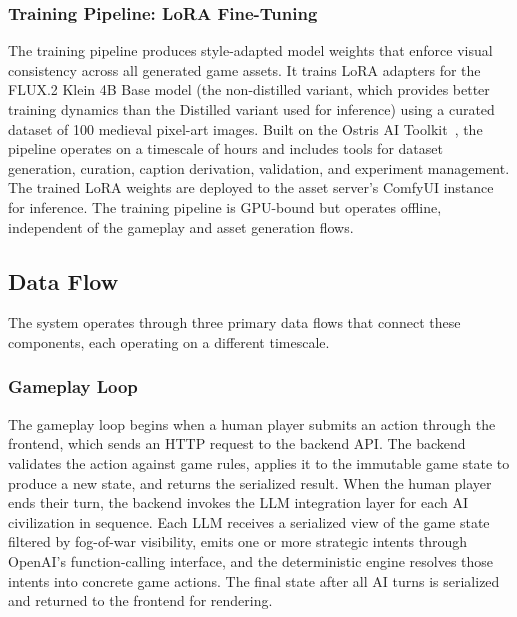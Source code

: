 \documentclass[conference]{IEEEtran}
\begin{document}
\subsubsection{Training Pipeline: LoRA Fine-Tuning}

The training pipeline produces style-adapted model weights that enforce visual consistency across all generated game assets. It trains LoRA adapters for the FLUX.2 Klein 4B Base model (the non-distilled variant, which provides better training dynamics than the Distilled variant used for inference) using a curated dataset of 100 medieval pixel-art images. Built on the Ostris AI Toolkit~\cite{ostris2024toolkit}, the pipeline operates on a timescale of hours and includes tools for dataset generation, curation, caption derivation, validation, and experiment management. The trained LoRA weights are deployed to the asset server's ComfyUI instance for inference. The training pipeline is GPU-bound but operates offline, independent of the gameplay and asset generation flows.

\subsection{Data Flow}


The system operates through three primary data flows that connect these components, each operating on a different timescale.

\subsubsection{Gameplay Loop}

The gameplay loop begins when a human player submits an action through the frontend, which sends an HTTP request to the backend API. The backend validates the action against game rules, applies it to the immutable game state to produce a new state, and returns the serialized result. When the human player ends their turn, the backend invokes the LLM integration layer for each AI civilization in sequence. Each LLM receives a serialized view of the game state filtered by fog-of-war visibility, emits one or more strategic intents through OpenAI's function-calling interface, and the deterministic engine resolves those intents into concrete game actions. The final state after all AI turns is serialized and returned to the frontend for rendering.
\end{document}
